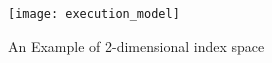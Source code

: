 \begin{figure}[h]
    \centering
    \texttt{[image: execution\_model]}
    \caption{An Example of 2-dimensional index space}
    \label{fig:3}
\end{figure}